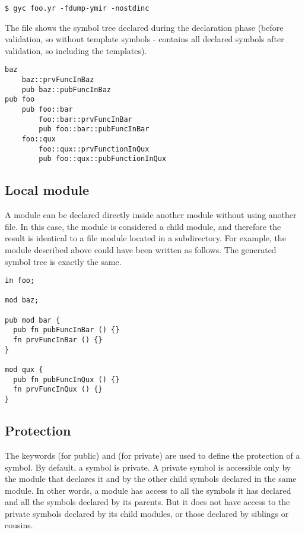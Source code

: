 \begin{lstlisting}[style=intermediateVerb]
$ gyc foo.yr -fdump-ymir -nostdinc
\end{lstlisting}

The file  shows the symbol tree declared during the
declaration phase (before validation, so without template symbols -
 contains all declared symbols after validation, so
including the templates).

\begin{lstlisting}[style=intermediateVerb]
baz
    baz::prvFuncInBaz
    pub baz::pubFuncInBaz
pub foo
    pub foo::bar
        foo::bar::prvFuncInBar
        pub foo::bar::pubFuncInBar
    foo::qux
        foo::qux::prvFunctionInQux
        pub foo::qux::pubFunctionInQux
\end{lstlisting}

\subsection{Local module}

A module can be declared directly inside another module without using another
file. In this case, the module is considered a child module, and therefore the
result is identical to a file module located in a subdirectory. For example, the
 module described above could have been written as follows. The
generated symbol tree is exactly the same.

\begin{lstlisting}[caption=\textit{./foo.yr}, style=coloredverbatim]
in foo;

mod baz;

pub mod bar {
  pub fn pubFuncInBar () {}
  fn prvFuncInBar () {}
}

mod qux {
  pub fn pubFuncInQux () {}
  fn prvFuncInQux () {}
}
\end{lstlisting}

\subsection{Protection}
\label{sec:symbol_protection}

The keywords  (for public) and  (for private) are used
to define the protection of a symbol. By default, a symbol is private. A private
symbol is accessible only by the module that declares it and by the other child
symbols declared in the same module. In other words, a module has access to all
the symbols it has declared and all the symbols declared by its parents. But it
does not have access to the private symbols declared by its child modules, or
those declared by siblings or cousins.

